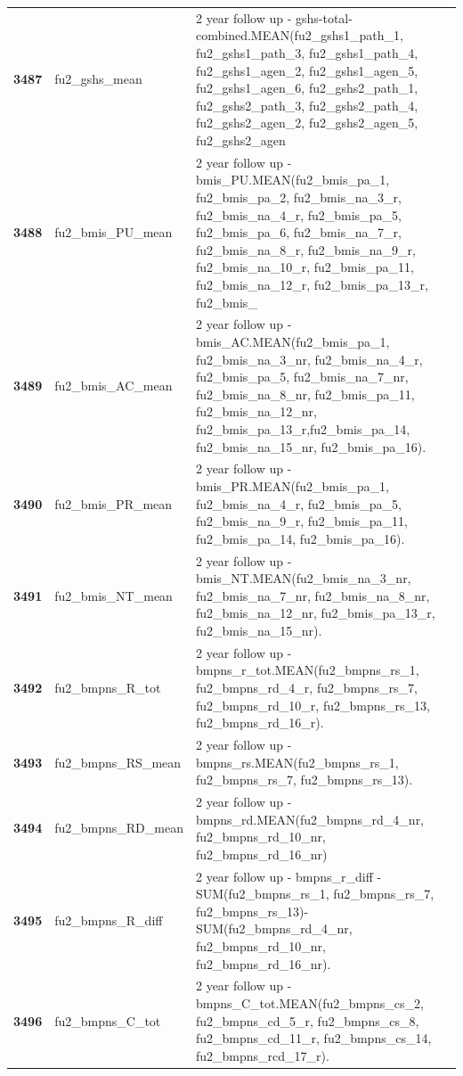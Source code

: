 \documentclass[
  letterpaper,
  DIV=11,
  numbers=noendperiod]{scrartcl}
\begin{document}
\begin{longtable}[t]{>{}cll}
\textbf{3487} & fu2\_gshs\_mean & 2 year follow up - gshs-total-combined.MEAN(fu2\_gshs1\_path\_1, fu2\_gshs1\_path\_3, fu2\_gshs1\_path\_4, fu2\_gshs1\_agen\_2, fu2\_gshs1\_agen\_5, fu2\_gshs1\_agen\_6, fu2\_gshs2\_path\_1, fu2\_gshs2\_path\_3, fu2\_gshs2\_path\_4, fu2\_gshs2\_agen\_2, fu2\_gshs2\_agen\_5, fu2\_gshs2\_agen\\
\textbf{3488} & fu2\_bmis\_PU\_mean & 2 year follow up - bmis\_PU.MEAN(fu2\_bmis\_pa\_1, fu2\_bmis\_pa\_2, fu2\_bmis\_na\_3\_r, fu2\_bmis\_na\_4\_r, fu2\_bmis\_pa\_5, fu2\_bmis\_pa\_6, fu2\_bmis\_na\_7\_r, fu2\_bmis\_na\_8\_r, fu2\_bmis\_na\_9\_r, fu2\_bmis\_na\_10\_r, fu2\_bmis\_pa\_11, fu2\_bmis\_na\_12\_r, fu2\_bmis\_pa\_13\_r, fu2\_bmis\_\\
\textbf{3489} & fu2\_bmis\_AC\_mean & 2 year follow up - bmis\_AC.MEAN(fu2\_bmis\_pa\_1, fu2\_bmis\_na\_3\_nr, fu2\_bmis\_na\_4\_r, fu2\_bmis\_pa\_5, fu2\_bmis\_na\_7\_nr, fu2\_bmis\_na\_8\_nr, fu2\_bmis\_pa\_11, fu2\_bmis\_na\_12\_nr, fu2\_bmis\_pa\_13\_r,fu2\_bmis\_pa\_14, fu2\_bmis\_na\_15\_nr, fu2\_bmis\_pa\_16).\\
\textbf{3490} & fu2\_bmis\_PR\_mean & 2 year follow up - bmis\_PR.MEAN(fu2\_bmis\_pa\_1, fu2\_bmis\_na\_4\_r, fu2\_bmis\_pa\_5, fu2\_bmis\_na\_9\_r, fu2\_bmis\_pa\_11, fu2\_bmis\_pa\_14, fu2\_bmis\_pa\_16).\\
\addlinespace
\textbf{3491} & fu2\_bmis\_NT\_mean & 2 year follow up - bmis\_NT.MEAN(fu2\_bmis\_na\_3\_nr, fu2\_bmis\_na\_7\_nr, fu2\_bmis\_na\_8\_nr, fu2\_bmis\_na\_12\_nr, fu2\_bmis\_pa\_13\_r, fu2\_bmis\_na\_15\_nr).\\
\textbf{3492} & fu2\_bmpns\_R\_tot & 2 year follow up - bmpns\_r\_tot.MEAN(fu2\_bmpns\_rs\_1, fu2\_bmpns\_rd\_4\_r, fu2\_bmpns\_rs\_7, fu2\_bmpns\_rd\_10\_r, fu2\_bmpns\_rs\_13, fu2\_bmpns\_rd\_16\_r).\\
\textbf{3493} & fu2\_bmpns\_RS\_mean & 2 year follow up - bmpns\_rs.MEAN(fu2\_bmpns\_rs\_1, fu2\_bmpns\_rs\_7, fu2\_bmpns\_rs\_13).\\
\textbf{3494} & fu2\_bmpns\_RD\_mean & 2 year follow up - bmpns\_rd.MEAN(fu2\_bmpns\_rd\_4\_nr, fu2\_bmpns\_rd\_10\_nr, fu2\_bmpns\_rd\_16\_nr)\\
\textbf{3495} & fu2\_bmpns\_R\_diff & 2 year follow up - bmpns\_r\_diff - SUM(fu2\_bmpns\_rs\_1, fu2\_bmpns\_rs\_7, fu2\_bmpns\_rs\_13)-SUM(fu2\_bmpns\_rd\_4\_nr, fu2\_bmpns\_rd\_10\_nr, fu2\_bmpns\_rd\_16\_nr).\\
\addlinespace
\textbf{3496} & fu2\_bmpns\_C\_tot & 2 year follow up - bmpns\_C\_tot.MEAN(fu2\_bmpns\_cs\_2, fu2\_bmpns\_cd\_5\_r, fu2\_bmpns\_cs\_8, fu2\_bmpns\_cd\_11\_r, fu2\_bmpns\_cs\_14, fu2\_bmpns\_rcd\_17\_r).\\

\end{longtable}
\end{document}
